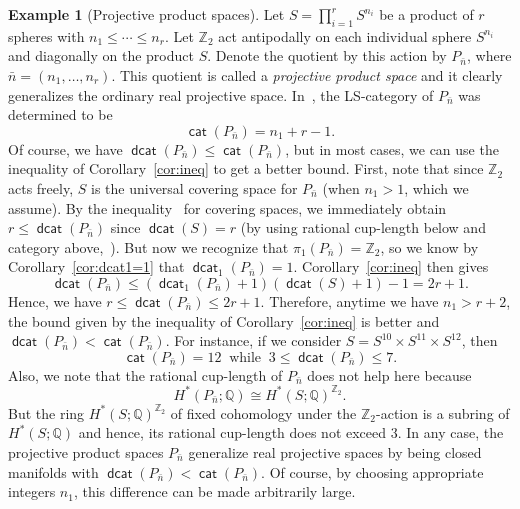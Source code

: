 \documentclass[amscd,amssymb,verbatim,11pt]{amsart}
\theoremstyle{plain}
\theoremstyle{definition}
\newtheorem{ex}[thm]{Example}
\DeclareMathOperator{\cat}{{\mathsf{cat}}}
\DeclareMathOperator{\dcat}{{\mathsf{dcat}}}
\def\Z{{\mathbb Z}}
\def\Q{{\mathbb Q}}
\begin{document}
\begin{ex}[Projective product spaces]\label{exam:projprods}
Let $S=\prod_{i=1}^r S^{n_i}$ be a product of $r$ spheres with $n_1 \leq \cdots \leq n_r$. Let $\Z_2$ act antipodally on each individual sphere $S^{n_i}$ and diagonally on the product $S$. Denote the quotient by this action 
by $P_{\bar n}$, where $\bar n = (n_1,\ldots,n_r)$. This quotient is 
called a \emph{projective product space} and it clearly generalizes the
ordinary real projective space. In~\cite{FV}, the LS-category of $P_{\bar n}$
was determined to be
$$\cat(P_{\bar n}) = n_1 + r - 1.$$
Of course, we have $\dcat(P_{\bar n}) \leq \cat(P_{\bar n})$, but in 
most cases, we can use the inequality of Corollary~\ref{cor:ineq} to 
get a better bound. First, note that since $\Z_2$ acts freely, $S$ is the
universal covering space for $P_{\bar n}$ (when $n_1 > 1$, which we assume). 
By the inequality~\cite[Theorem 3.7]{DJ} for covering spaces, we immediately obtain $r \leq 
\dcat(P_{\bar n})$ since $\dcat(S) = r$ (by using rational cup-length below and category above,~\cite[Section~6.1]{DJ}). But now we recognize that $\pi_1(P_{\bar n}) = \Z_2$, so we know by Corollary~\ref{cor:dcat1=1} that
$\dcat_1(P_{\bar n}) = 1$. Corollary~\ref{cor:ineq}
then gives
\[
\dcat(P_{\bar n}) \leq (\dcat_1(P_{\bar n}) + 1)(\dcat(S) + 1) - 1 =2r+1.
\]
Hence, we have $r \leq \dcat(P_{\bar n}) \leq 2r+1$. Therefore, anytime we have
$n_1 > r + 2$, the bound given by the inequality of Corollary~\ref{cor:ineq} is better and $\dcat(P_{\bar n})<\cat(P_{\bar n})$. For 
instance, if we consider $S = S^{10} \times S^{11} \times S^{12}$, then 
$$\cat(P_{\bar n}) = 12\ \text{ while }\ 3 \leq \dcat(P_{\bar n}) \leq 7.$$
Also, we note that the rational cup-length of $P_{\bar n}$ does not help here because
$$H^*(P_{\bar n};\Q) \cong H^*(S;\Q)^{\Z_2}.$$
But the ring $H^*(S;\Q)^{\Z_2}$ of fixed cohomology under the $\Z_2$-action is a subring of $H^*(S;\Q)$ and hence, its rational cup-length does not exceed $3$.
In any case, the projective product spaces $P_{\bar n}$ generalize real projective spaces by being closed manifolds with $\dcat(P_{\bar n}) < \cat(P_{\bar n})$. Of
course, by choosing appropriate integers $n_1$, this difference can be made arbitrarily large. 
\end{ex}
\end{document}
